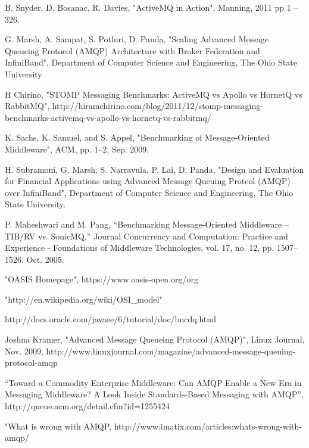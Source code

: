 \documentclass{thesis}
\begin{document}
\begin{singlespace}
\begin{thebibliography}{99}

 B. Snyder, D. Bosanac, R. Davies, "ActiveMQ in Action", Manning, 2011 pp 1 – 326.

 G. Marsh, A. Sampat, S. Potluri, D. Panda, "Scaling Advanced Message Queueing Protocol (AMQP) Architecture with Broker Federation and InfiniBand", Department of Computer Science and Engineering, The Ohio State University

 H Chirino, "STOMP Messaging Benchmarks: ActiveMQ vs Apollo vs HornetQ vs RabbitMQ", http://hiramchirino.com/blog/2011/12/stomp-messaging-benchmarks-activemq-vs-apollo-vs-hornetq-vs-rabbitmq/

 K. Sachs, K. Samuel, and S. Appel, "Benchmarking of Message-Oriented Middleware", ACM, pp. 1–2, Sep. 2009.

 H. Subramoni, G. Marsh, S. Narravula, P. Lai, D. Panda, "Design and Evaluation for Financial Applications using Advanced Message Queuing Protcol (AMQP) over InfiniBand", Department of Computer Science and Engineering, The Ohio State University.

 P. Maheshwari and M. Pang, “Benchmarking Message-Oriented Middleware – TIB/RV vs. SonicMQ,” Journal Concurrency and Computation: Practice and Experience - Foundations of Middleware Technologies, vol. 17, no. 12, pp. 1507–1526, Oct. 2005.

 "OASIS Homepage", https://www.oasis-open.org/org

 "http://en.wikipedia.org/wiki/OSI\_model"

 http://docs.oracle.com/javaee/6/tutorial/doc/bncdq.html

 Joshua Kramer, "Advanced Message Queueing Protocol (AMQP)", Linux Journal, Nov. 2009, http://www.linuxjournal.com/magazine/advanced-message-queuing-protocol-amqp

 “Toward a Commodity Enterprise Middleware: Can AMQP Enable a New Era in Messaging Middleware? A Look Inside Standards-Based Messaging with AMQP”, http://queue.acm.org/detail.cfm?id=1255424

 "What is wrong with AMQP, http://www.imatix.com/articles:whats-wrong-with-amqp/


\end{thebibliography}
\end{singlespace}
\end{document}
